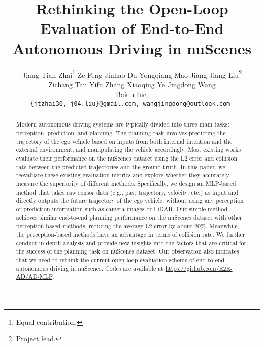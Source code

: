 \documentclass[10pt,twocolumn,letterpaper]{article}
\begin{document}
\title{Rethinking the Open-Loop Evaluation of End-to-End Autonomous Driving in nuScenes}


\author{Jiang-Tian Zhai\thanks{Equal contribution.} \quad
Ze Feng\footnotemark[1] \quad
Jinhao Du\footnotemark[1] \quad
Yongqiang Mao\footnotemark[1] \quad
Jiang-Jiang Liu\thanks{Project lead.}\\
Zichang Tan \quad
Yifu Zhang \quad
Xiaoqing Ye \quad
Jingdong Wang\footnotemark[2] \\ 
[2mm]
Baidu Inc. \\
\tt\small{\{jtzhai30, j04.liu\}@gmail.com,
wangjingdong@outlook.com}
}

\maketitle

\begin{abstract}
Modern autonomous driving systems are typically divided into three main tasks: perception, prediction, and planning. 
The planning task involves predicting the trajectory of the ego vehicle 
based on inputs from both internal intention and 
the external environment, and manipulating the vehicle accordingly. 
Most existing works evaluate their performance on the nuScenes dataset using the L2 error and collision rate between the predicted trajectories and the ground truth. 
In this paper, we reevaluate these existing evaluation metrics and explore whether they accurately measure the superiority of different methods. 
Specifically, we design an MLP-based method that takes raw sensor data (e.g., past trajectory, velocity, etc.) as input and directly outputs the future trajectory of the ego vehicle, 
without using any perception or prediction information such as camera images or LiDAR. 
Our simple method achieves similar end-to-end planning performance on the nuScenes dataset with other perception-based methods, 
reducing the average L2 error by about 20\%. 
Meanwhile, the perception-based methods have an advantage in terms of collision rate.
We further conduct in-depth analysis and provide new insights into the factors that are critical for the success of the planning task 
on nuScenes dataset.
Our observation also indicates that we need to rethink the current open-loop evaluation scheme
of end-to-end autonomous driving in nuScenes.
Codes are available at \url{https://github.com/E2E-AD/AD-MLP}.


\end{abstract}
\end{document}
